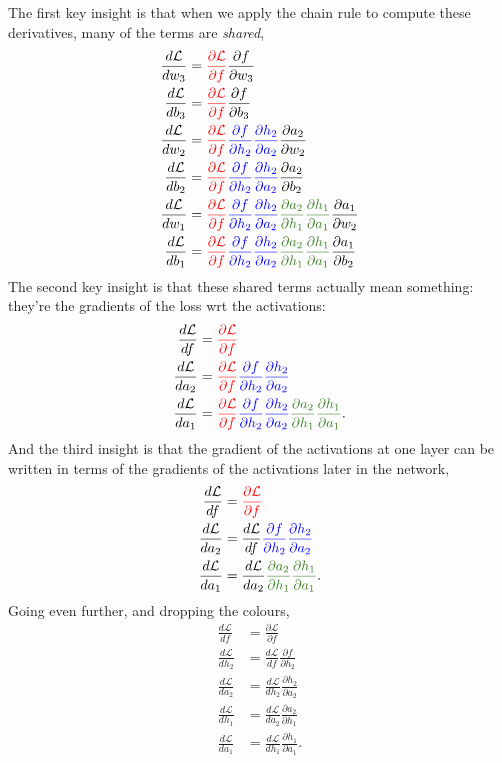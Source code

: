 \documentclass{article}
\newcommand{\dd}[2][]{\frac{\partial #1}{\partial #2}}
\newcommand{\dt}[2][]{\frac{d #1}{d #2}}
\newcommand{\dL}{\dt[\L]}
\renewcommand{\L}{\mathcal{L}}
\begin{document}
The first key insight is that when we apply the chain rule to compute these derivatives, many of the terms are \textit{shared},
\newcommand{\cola}{\textcolor{red}}
\newcommand{\colb}{\textcolor{blue}}
\newcommand{\colc}{\textcolor{OliveGreen}}
\begin{subequations}
\begin{align}
  \dL{w_3} &= \cola{\dd[\L]{f}} \dd[f]{w_3}\\
  \dL{b_3} &= \cola{\dd[\L]{f}} \dd[f]{b_3}\\
  \dL{w_2} &= \cola{\dd[\L]{f}} \colb{\dd[f]{h_2} \dd[h_2]{a_2}} \dd[a_2]{w_2}\\
  \dL{b_2} &= \cola{\dd[\L]{f}} \colb{\dd[f]{h_2} \dd[h_2]{a_2}} \dd[a_2]{b_2}\\
  \dL{w_1} &= \cola{\dd[\L]{f}} \colb{\dd[f]{h_2} \dd[h_2]{a_2}} \colc{\dd[a_2]{h_1} \dd[h_1]{a_1}} \dd[a_1]{w_2}\\
  \dL{b_1} &= \cola{\dd[\L]{f}} \colb{\dd[f]{h_2} \dd[h_2]{a_2}} \colc{\dd[a_2]{h_1} \dd[h_1]{a_1}} \dd[a_1]{b_2}
\end{align}
\end{subequations}
The second key insight is that these shared terms actually mean something: they're the gradients of the loss wrt the activations:
\begin{subequations}
\begin{align}
  \dL{f} &= \cola{\dd[\L]{f}}\\
  \dL{a_2} &= \cola{\dd[\L]{f}} \colb{\dd[f]{h_2} \dd[h_2]{a_2}}\\
  \dL{a_1} &= \cola{\dd[\L]{f}} \colb{\dd[f]{h_2} \dd[h_2]{a_2}} \colc{\dd[a_2]{h_1} \dd[h_1]{a_1}}.
\end{align}
\end{subequations}
And the third insight is that the gradient of the activations at one layer can be written in terms of the gradients of the activations later in the network,
\begin{subequations}
\begin{align}
  \dL{f} &= \cola{\dd[\L]{f}}\\
  \dL{a_2} &= \dL{f} \colb{\dd[f]{h_2} \dd[h_2]{a_2}}\\
  \dL{a_1} &= \dL{a_2} \colc{\dd[a_2]{h_1} \dd[h_1]{a_1}}.
\end{align}
\end{subequations}
Going even further, and dropping the colours,
\begin{subequations}
\begin{align}
  \dL{f} &= \dd[\L]{f}\\
  \dL{h_2} &= \dL{f} \dd[f]{h_2}\\
  \dL{a_2} &= \dL{h_2} \dd[h_2]{a_2}\\
  \dL{h_1} &= \dL{a_2} \dd[a_2]{h_1}\\
  \dL{a_1} &= \dL{h_1} \dd[h_1]{a_1}.
\end{align}
\end{subequations}
\end{document}
